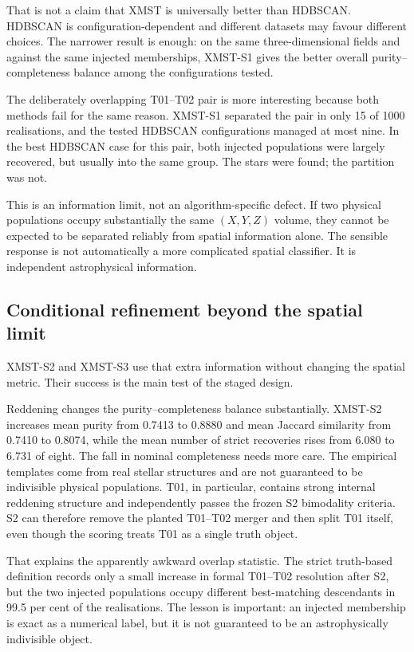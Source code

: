 \documentclass[fleqn,usenatbib]{rasti}
\begin{document}
That is not a claim that XMST is universally better than HDBSCAN. HDBSCAN is configuration-dependent and different datasets may favour different choices. The narrower result is enough: on the same three-dimensional fields and against the same injected memberships, XMST-S1 gives the better overall purity--completeness balance among the configurations tested.

The deliberately overlapping T01--T02 pair is more interesting because both methods fail for the same reason. XMST-S1 separated the pair in only 15 of 1000 realisations, and the tested HDBSCAN configurations managed at most nine. In the best HDBSCAN case for this pair, both injected populations were largely recovered, but usually into the same group. The stars were found; the partition was not.

This is an information limit, not an algorithm-specific defect. If two physical populations occupy substantially the same $(X,Y,Z)$ volume, they cannot be expected to be separated reliably from spatial information alone. The sensible response is not automatically a more complicated spatial classifier. It is independent astrophysical information.

\subsection{Conditional refinement beyond the spatial limit}

XMST-S2 and XMST-S3 use that extra information without changing the spatial metric. Their success is the main test of the staged design.

Reddening changes the purity--completeness balance substantially. XMST-S2 increases mean purity from 0.7413 to 0.8880 and mean Jaccard similarity from 0.7410 to 0.8074, while the mean number of strict recoveries rises from 6.080 to 6.731 of eight. The fall in nominal completeness needs more care. The empirical templates come from real stellar structures and are not guaranteed to be indivisible physical populations. T01, in particular, contains strong internal reddening structure and independently passes the frozen S2 bimodality criteria. S2 can therefore remove the planted T01--T02 merger and then split T01 itself, even though the scoring treats T01 as a single truth object.

That explains the apparently awkward overlap statistic. The strict truth-based definition records only a small increase in formal T01--T02 resolution after S2, but the two injected populations occupy different best-matching descendants in 99.5 per cent of the realisations. The lesson is important: an injected membership is exact as a numerical label, but it is not guaranteed to be an astrophysically indivisible object.
\end{document}
